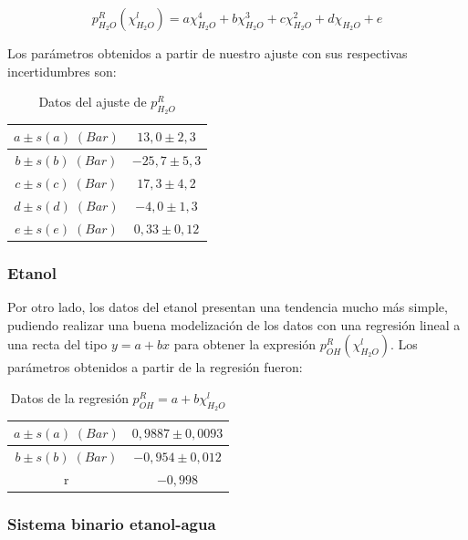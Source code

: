 \documentclass[a4paper,12pt,titlepage]{article}
\begin{document}
\begin{equation}
    p^R_{H_2O}(\chi_{H_2O}^l) = a \chi_{H_2O}^4 + b \chi_{H_2O}^3 + c \chi_{H_2O}^2 + d\chi_{H_2O} + e  
\end{equation}

Los parámetros obtenidos a partir de nuestro ajuste con sus respectivas incertidumbres son:

\begin{table}[h!]
    \centering
    \begin{tabular}{|c|c|}
    \hline
    $a \pm s(a) \;(Bar)$ &  $13,0 \pm 2,3$\\ \hline
    $b\pm s(b) \; (Bar)$ & $-25,7 \pm 5,3$ \\ \hline
    $c \pm s(c) \; (Bar)$ & $17,3 \pm 4,2$\\ \hline
    $d \pm s(d) \; (Bar)$ & $-4,0 \pm 1,3$ \\ \hline
    $e \pm s(e) \; (Bar)$ & $0,33 \pm 0,12$ \\ \hline
    \end{tabular}
    \caption{Datos del ajuste de $p^R_{H_2O}$}
    \label{tab:my_label}
\end{table}

\subsubsection{Etanol}

Por otro lado, los datos del etanol presentan una tendencia mucho más simple, pudiendo realizar una buena modelización de los datos con una regresión lineal a una recta del tipo $y=a+bx$ para obtener la expresión $p_{OH}^R(\chi_{H_2O}^l)$. Los parámetros obtenidos a partir de la regresión fueron:

\begin{table}[h!]
\centering
\begin{tabular}{|c|c|}
\hline
$a \pm s(a) \;(Bar)$ &  $0,9887 \pm 0,0093$\\ \hline
$b \pm s(b) \; (Bar)$ &  $-0,954 \pm 0,012$\\ \hline
r            &  $-0,998$\\ \hline
\end{tabular}
\caption{Datos de la regresión $p^R_{OH} = a + b\chi_{H_2O}^l$}
\label{tab:my-table}
\end{table}

\subsubsection{Sistema binario etanol-agua}
\end{document}
